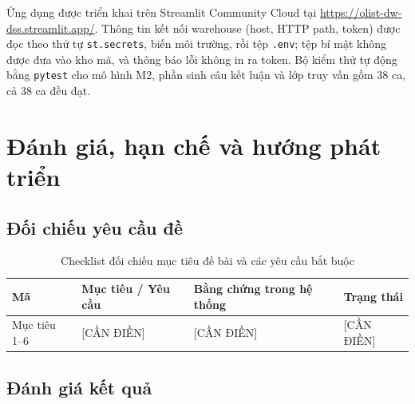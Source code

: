 \documentclass[a4paper]{article}
\begin{document}
Ứng dụng được triển khai trên Streamlit Community Cloud tại \url{https://olist-dw-dss.streamlit.app/}. Thông tin kết nối warehouse (host, HTTP path, token) được đọc theo thứ tự \texttt{st.secrets}, biến môi trường, rồi tệp \texttt{.env}; tệp bí mật không được đưa vào kho mã, và thông báo lỗi không in ra token. Bộ kiểm thử tự động bằng \texttt{pytest} cho mô hình M2, phần sinh câu kết luận và lớp truy vấn gồm 38 ca, cả 38 ca đều đạt.

\section{Đánh giá, hạn chế và hướng phát triển}
\label{sec:ch6}

\subsection{Đối chiếu yêu cầu đề}
\label{subsec:6_1}

\begin{table}[htbp]
\centering
\caption{Checklist đối chiếu mục tiêu đề bài và các yêu cầu bắt buộc}
\label{tab:rtm_checklist}
\begin{tabularx}{\textwidth}{lXXl}
\toprule
\textbf{Mã} & \textbf{Mục tiêu / Yêu cầu} & \textbf{Bằng chứng trong hệ thống} & \textbf{Trạng thái} \\
\midrule
Mục tiêu 1--6 & [CẦN ĐIỀN] & [CẦN ĐIỀN] & [CẦN ĐIỀN] \\
\bottomrule
\end{tabularx}
\end{table}

\subsection{Đánh giá kết quả}
\label{subsec:6_2}
\end{document}
